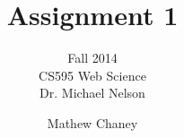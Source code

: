 \documentclass[10pt,letterpaper]{scrartcl}
\begin{document}
\author{Mathew Chaney}
\title{Assignment 1}
\subtitle{Fall 2014\\ CS595 Web Science\\ Dr. Michael Nelson}
\maketitle
\newpage

\tableofcontents

\listoffigures




\end{document}
